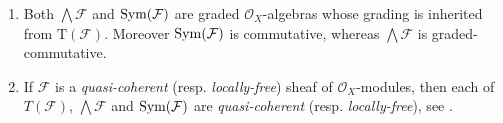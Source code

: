 \begin{rem}[]\leavevmode\vspace{-.2\baselineskip}
\label{rem:SheafSymExtProperties}
\begin{enumerate}
	\item Both $\bigwedge \mathcal{F}$ and $\operatorname{Sym}(\mathcal{F})$
		are graded $\mathcal{O}_{ X }$-algebras whose grading is
		inherited from $\mathrm{T}(\mathcal{F})$.
		Moreover $\operatorname{Sym}(\mathcal{F})$ is commutative,
		whereas $\bigwedge \mathcal{F}$ is graded-commutative.


	\item \label{SheafqcSymExt}
		If $\mathcal{F}$ is a \emph{quasi-coherent} (resp$.$ \emph{locally-free})
		sheaf of $\mathcal{O}_{ X }$-modules,
		then each of $T(\mathcal{F})$, $\bigwedge \mathcal{F}$ and
		$\operatorname{Sym}(\mathcal{F})$ are \emph{quasi-coherent} (resp$.$ \emph{locally-free}),
		see \cite[\href{https://stacks.math.columbia.edu/tag/01CL}{Lemma 01CL}]{SP}.
\end{enumerate}
\end{rem}


